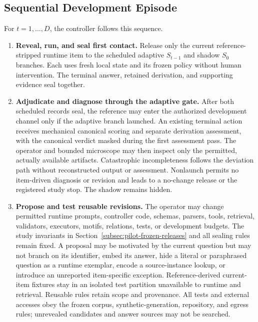 \documentclass[10pt]{article} %
\providecommand{\1}{\mathbf{1}}  %
\theoremstyle{remark}
\theoremstyle{definition}
\begin{document}
\subsection{Sequential Development Episode}

\label{subsec:pilot-development-episode}

For $t=1,\ldots,D$, the controller follows this sequence.
\begin{enumerate}[leftmargin=*,itemsep=4pt,topsep=4pt]
\item \textbf{Reveal, run, and seal first contact.}
Release only the current reference-stripped runtime item to the scheduled
adaptive $S_{t-1}$ and shadow $S_0$ branches. Each uses fresh local state and
its frozen policy without human intervention. The terminal answer, retained
derivation, and supporting evidence seal together.

\item \textbf{Adjudicate and diagnose through the adaptive gate.}
After both scheduled records seal, the reference may enter the authorized
development channel only if the adaptive branch launched. An existing
terminal action receives mechanical canonical scoring and separate
derivation assessment, with the canonical verdict masked during the first
assessment pass. The operator and bounded microscope may then inspect only
the permitted, actually available artifacts. Catastrophic incompleteness
follows the deviation path without reconstructed output or assessment.
Nonlaunch permits no item-driven diagnosis or revision and leads to a
no-change release or the registered study stop. The shadow remains hidden.

\item \textbf{Propose and test reusable revisions.}
The operator may change permitted runtime prompts, controller code, schemas,
parsers, tools, retrieval, validators, executors, motifs, relations, tests,
or development budgets. The study invariants in
Section~\ref{subsec:pilot-frozen-releases} and all sealing rules remain fixed.
A proposal may be motivated by the current question but may not branch on
its identifier, embed its answer, hide a literal or paraphrased question
as a runtime exemplar, encode a source-instance lookup, or introduce an
unreported item-specific exception. Reference-derived current-item fixtures
stay in an isolated test partition unavailable to runtime and retrieval.
Reusable rules retain scope and provenance. All tests and external accesses
obey the frozen corpus, synthetic-generation, repository, and egress rules;
unrevealed candidates and answer sources may not be searched.


\end{enumerate}
\end{document}
